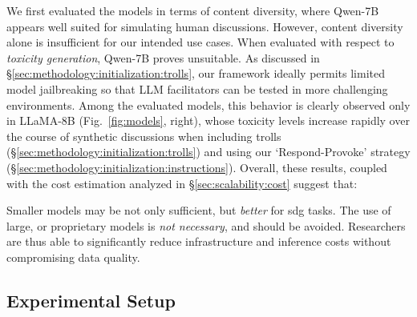 We first evaluated the models in terms of content diversity, where Qwen-7B appears well suited for simulating human discussions. However, content diversity alone is insufficient for our intended use cases. When evaluated with respect to \emph{toxicity generation}, Qwen-7B proves unsuitable. As discussed in \S\ref{sec:methodology:initialization:trolls}, our framework ideally permits limited model jailbreaking so that LLM facilitators can be tested in more challenging environments. Among the evaluated models, this behavior is clearly observed only in LLaMA-8B (Fig.~\ref{fig:models}, right), whose toxicity levels increase rapidly over the course of synthetic discussions when including trolls (\S\ref{sec:methodology:initialization:trolls}) and using our `Respond-Provoke' strategy (\S\ref{sec:methodology:initialization:instructions}). Overall, these results, coupled with the cost estimation analyzed in \S\ref{sec:scalability:cost} suggest that:

\begin{finding}
	\label{finding:model}
	Smaller models may be not only sufficient, but \emph{better} for \ac{sdg} tasks. The use of large, or proprietary models is \emph{not necessary}, and should be avoided. Researchers are thus able to significantly reduce infrastructure and inference costs without compromising data quality.
\end{finding}



\subsection{Experimental Setup}
\label{sec:scalability:experimental}

